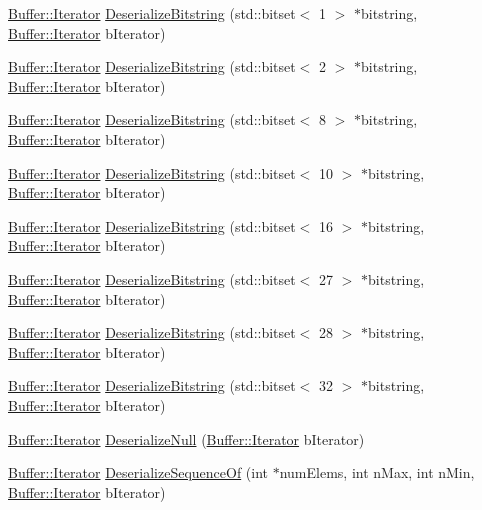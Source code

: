 \begin{DoxyCompactItemize}
\item 
\hyperlink{classns3_1_1Buffer_1_1Iterator}{Buffer\+::\+Iterator} \hyperlink{classns3_1_1Asn1Header_a374882c4bcb14ef73ce84d69c22a283a}{Deserialize\+Bitstring} (std\+::bitset$<$ 1 $>$ $\ast$bitstring, \hyperlink{classns3_1_1Buffer_1_1Iterator}{Buffer\+::\+Iterator} b\+Iterator)
\item 
\hyperlink{classns3_1_1Buffer_1_1Iterator}{Buffer\+::\+Iterator} \hyperlink{classns3_1_1Asn1Header_aad15b5e4bb69bf621dddeddab6ad5b3f}{Deserialize\+Bitstring} (std\+::bitset$<$ 2 $>$ $\ast$bitstring, \hyperlink{classns3_1_1Buffer_1_1Iterator}{Buffer\+::\+Iterator} b\+Iterator)
\item 
\hyperlink{classns3_1_1Buffer_1_1Iterator}{Buffer\+::\+Iterator} \hyperlink{classns3_1_1Asn1Header_a8cbe17c2183f0ddc665ebe961507577f}{Deserialize\+Bitstring} (std\+::bitset$<$ 8 $>$ $\ast$bitstring, \hyperlink{classns3_1_1Buffer_1_1Iterator}{Buffer\+::\+Iterator} b\+Iterator)
\item 
\hyperlink{classns3_1_1Buffer_1_1Iterator}{Buffer\+::\+Iterator} \hyperlink{classns3_1_1Asn1Header_a3ad04d7f607b09a1190c1124574588a2}{Deserialize\+Bitstring} (std\+::bitset$<$ 10 $>$ $\ast$bitstring, \hyperlink{classns3_1_1Buffer_1_1Iterator}{Buffer\+::\+Iterator} b\+Iterator)
\item 
\hyperlink{classns3_1_1Buffer_1_1Iterator}{Buffer\+::\+Iterator} \hyperlink{classns3_1_1Asn1Header_ad3d5e76b6573b2396e596ee1480959b3}{Deserialize\+Bitstring} (std\+::bitset$<$ 16 $>$ $\ast$bitstring, \hyperlink{classns3_1_1Buffer_1_1Iterator}{Buffer\+::\+Iterator} b\+Iterator)
\item 
\hyperlink{classns3_1_1Buffer_1_1Iterator}{Buffer\+::\+Iterator} \hyperlink{classns3_1_1Asn1Header_a69324144138268cf964f4c51df243650}{Deserialize\+Bitstring} (std\+::bitset$<$ 27 $>$ $\ast$bitstring, \hyperlink{classns3_1_1Buffer_1_1Iterator}{Buffer\+::\+Iterator} b\+Iterator)
\item 
\hyperlink{classns3_1_1Buffer_1_1Iterator}{Buffer\+::\+Iterator} \hyperlink{classns3_1_1Asn1Header_a4d2da2bd1caba71d50a9b6b34f0c37f8}{Deserialize\+Bitstring} (std\+::bitset$<$ 28 $>$ $\ast$bitstring, \hyperlink{classns3_1_1Buffer_1_1Iterator}{Buffer\+::\+Iterator} b\+Iterator)
\item 
\hyperlink{classns3_1_1Buffer_1_1Iterator}{Buffer\+::\+Iterator} \hyperlink{classns3_1_1Asn1Header_a0dbe2e770ccfdbe4378790dbe7b5ab77}{Deserialize\+Bitstring} (std\+::bitset$<$ 32 $>$ $\ast$bitstring, \hyperlink{classns3_1_1Buffer_1_1Iterator}{Buffer\+::\+Iterator} b\+Iterator)
\item 
\hyperlink{classns3_1_1Buffer_1_1Iterator}{Buffer\+::\+Iterator} \hyperlink{classns3_1_1Asn1Header_a29bd4508f3f1ef636b3480f524fac0ce}{Deserialize\+Null} (\hyperlink{classns3_1_1Buffer_1_1Iterator}{Buffer\+::\+Iterator} b\+Iterator)
\item 
\hyperlink{classns3_1_1Buffer_1_1Iterator}{Buffer\+::\+Iterator} \hyperlink{classns3_1_1Asn1Header_a1a7245e05b482df8abade0a060bd0ecc}{Deserialize\+Sequence\+Of} (int $\ast$num\+Elems, int n\+Max, int n\+Min, \hyperlink{classns3_1_1Buffer_1_1Iterator}{Buffer\+::\+Iterator} b\+Iterator)
\end{DoxyCompactItemize}
